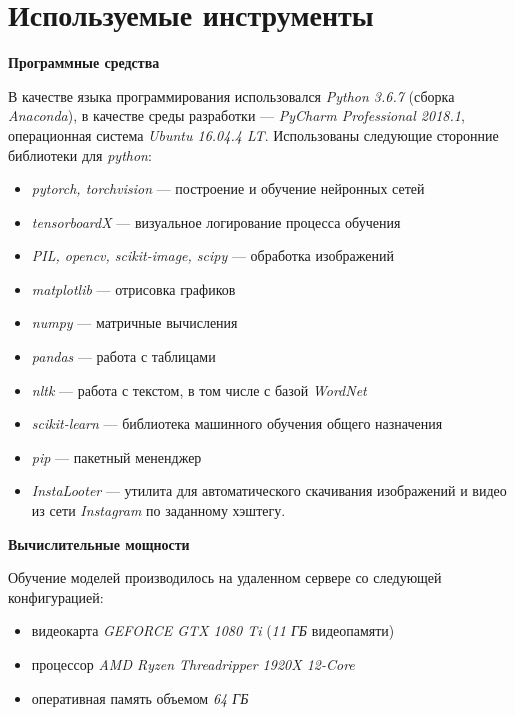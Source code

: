 \section{Используемые инструменты}

\indent
\indent
\textbf{Программные средства}

\indent
В качестве языка программирования использовался
 \textit{Python 3.6.7} (сборка \textit{Anaconda}),
 в качестве среды разработки --- \textit{PyCharm Professional 2018.1},
 операционная система \textit{Ubuntu 16.04.4 LT}. Использованы
 следующие сторонние библиотеки для \textit{python}:


\begin{itemize}

    \item \textit{pytorch, torchvision} --- построение и обучение нейронных сетей
    \item \textit{tensorboardX} --- визуальное логирование процесса обучения 
    \item \textit{PIL, opencv, scikit-image, scipy} --- обработка изображений
    \item \textit{matplotlib} --- отрисовка графиков
    \item \textit{numpy} --- матричные вычисления
    \item \textit{pandas} --- работа с таблицами
    \item \textit{nltk} --- работа с текстом, в том числе с базой \textit{WordNet}
    \item \textit{scikit-learn} --- библиотека машинного обучения общего назначения
    \item \textit{pip} --- пакетный мененджер
    \item \textit{InstaLooter} --- утилита для автоматического скачивания
    изображений и видео из сети \textit{Instagram} по заданному хэштегу.
   
\end{itemize}


\bigskip

\indent
\indent
\textbf{Вычислительные мощности}

\indent
\indent
Обучение моделей производилось на удаленном сервере со следующей конфигурацией:
\begin{itemize}
    \item видеокарта \textit{GEFORCE GTX 1080 Ti} (\textit{11 ГБ} видеопамяти)
    \item процессор \textit{AMD Ryzen Threadripper 1920X 12-Core}
    \item оперативная память объемом  \textit{64 ГБ}
\end{itemize}
